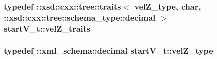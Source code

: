 \hypertarget{classstartV__t_ab8922309ab467a161007402cf39c89e5}{
\subsubsection[{vel\-Z\-\_\-traits}]{\setlength{\rightskip}{0pt plus 5cm}typedef \-::xsd\-::cxx\-::tree\-::traits$<$ {\bf vel\-Z\-\_\-type}, char, \-::xsd\-::cxx\-::tree\-::schema\-\_\-type\-::decimal $>$ {\bf start\-V\-\_\-t\-::vel\-Z\-\_\-traits}}}\label{classstartV__t_ab8922309ab467a161007402cf39c89e5}
\hypertarget{classstartV__t_ae49f578f0cc0d86f126691188752dfe9}{
\subsubsection[{vel\-Z\-\_\-type}]{\setlength{\rightskip}{0pt plus 5cm}typedef \-::{\bf xml\-\_\-schema\-::decimal} {\bf start\-V\-\_\-t\-::vel\-Z\-\_\-type}}}\label{classstartV__t_ae49f578f0cc0d86f126691188752dfe9}



